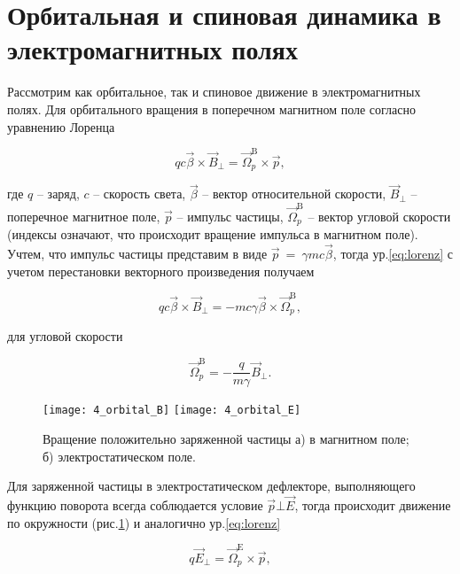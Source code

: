 \section{Орбитальная и спиновая динамика в электромагнитных полях}\label{sec:EDM/requirements/deflector}

\par Рассмотрим как орбитальное, так и спиновое движение в электромагнитных полях. Для орбитального вращения в поперечном магнитном поле согласно уравнению Лоренца

\begin{equation} \label{eq:lorenz}
qc\vec{\beta}\times{\vec{B}}_\bot={\vec{\Omega}}_p^{\textrm{B}}\times\vec{p},
\end{equation}

\noindent где $q$ -- заряд, $c$ -- скорость света, $\vec{\beta}$ -- вектор относительной скорости, ${\vec{B}}_\bot$ -- поперечное магнитное поле, $\vec{p}$ -- импульс частицы, ${\vec{\Omega}}_p^{\textrm{B}}$ -- вектор угловой скорости (индексы означают, что происходит вращение импульса в магнитном поле). Учтем, что импульс частицы представим в виде $\vec{p}\ =\ \gamma mc\vec{\beta}$, тогда ур.\ref{eq:lorenz} с учетом перестановки векторного произведения получаем

\begin{equation}	
qc\vec{\beta}\times{\vec{B}}_\bot=-mc\gamma\vec{\beta}\times{\vec{\Omega}}_p^{\textrm{B}},
\end{equation}

\noindent для угловой скорости

\begin{equation} \label{eq:omega_pB}
 {\vec{\Omega}}_p^{\textrm{B}}=-\frac{q}{m\gamma}{\vec{B}}_\bot.
\end{equation} 

\begin{figure}[!h]
  \centering
	\texttt{[image: 4\_orbital\_B]}
	\texttt{[image: 4\_orbital\_E]}
   \caption{Вращение положительно заряженной частицы а) в магнитном поле; б) электростатическом поле.}
   \label{fig:4_orbital_B_E}
\end{figure}

\par Для заряженной частицы в электростатическом дефлекторе, выполняющего функцию поворота всегда соблюдается условие $\vec{p} \bot \vec{E}$, тогда происходит движение по окружности (рис.\ref{fig:4_orbital_B_E}) и аналогично ур.\ref{eq:lorenz}

\begin{equation}
q{\vec{E}}_\bot={\vec{\Omega}}_p^{\textrm{E}}\times\vec{p},
\end{equation} 

